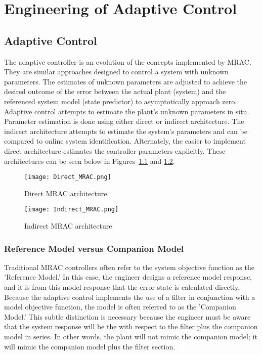 \chapter{Engineering of Adaptive Control}\label{ch:derivation}

\section{\Lone Adaptive Control}
The \Lone adaptive controller is an evolution of the concepts implemented by \ac{MRAC}.  They are similar approaches designed to control a system with unknown parameters.  The estimates of unknown parameters are adjusted to achieve the desired outcome of the error between the actual plant (system) and the referenced system model (state predictor) to asymptotically approach zero.   Adaptive control attempts to estimate the plant's unknown parameters in situ.  Parameter estimation is done using either direct or indirect architecture.  The indirect architecture attempts to estimate the system's parameters and can be compared to online system identification.  Alternately, the easier to implement direct architecture estimates the controller parameters explicitly.  These architectures can be seen below in Figures~\ref{fig:direct_mrac} and \ref{fig:indirect_mrac}.

\begin{figure}[h!]
 \centering
  \texttt{[image: Direct\_MRAC.png]}
  \caption{Direct \ac{MRAC} architecture }
  \label{fig:direct_mrac}
\end{figure}

\begin{figure}[h!]
 \centering
  \texttt{[image: Indirect\_MRAC.png]}
  \caption{Indirect \ac{MRAC} architecture }
  \label{fig:indirect_mrac}
\end{figure}

\subsection{Reference Model versus Companion Model}
Traditional \ac{MRAC} controllers often refer to the system objective function as the 'Reference Model.'  In this case, the engineer designs a reference model response, and it is from this model response that the error state is calculated directly.  Because the \Lone adaptive control implements the use of a filter in conjunction with a model objective function, the model is often referred to as the 'Companion Model.'  This subtle distinction is necessary because the engineer must be aware that the system response will be the with respect to the filter plus the companion model in series.  In other words, the plant will not mimic the companion model; it will mimic the companion model plus the filter section.

